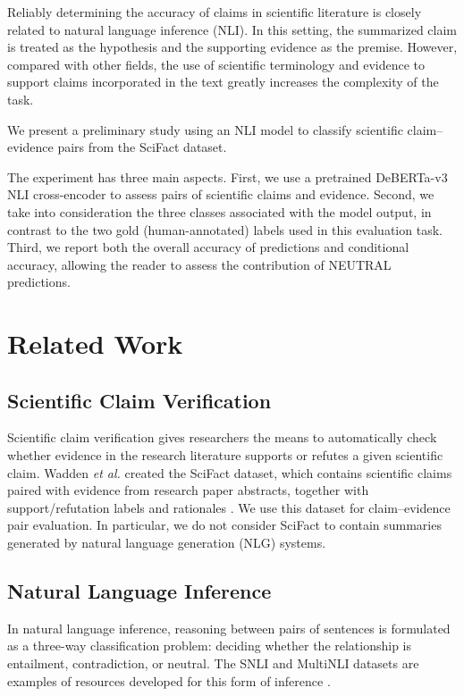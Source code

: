 \documentclass[conference]{IEEEtran}
\begin{document}
Reliably determining the accuracy of claims in scientific literature is closely related to natural language inference (NLI). In this setting, the summarized claim is treated as the hypothesis and the supporting evidence as the premise. However, compared with other fields, the use of scientific terminology and evidence to support claims incorporated in the text greatly increases the complexity of the task.

We present a preliminary study using an NLI model to classify scientific claim--evidence pairs from the SciFact dataset.

The experiment has three main aspects. First, we use a pretrained DeBERTa-v3 NLI cross-encoder to assess pairs of scientific claims and evidence. Second, we take into consideration the three classes associated with the model output, in contrast to the two gold (human-annotated) labels used in this evaluation task. Third, we report both the overall accuracy of predictions and conditional accuracy, allowing the reader to assess the contribution of NEUTRAL predictions.

\section{Related Work}

\subsection{Scientific Claim Verification}
Scientific claim verification gives researchers the means to automatically check whether evidence in the research literature supports or refutes a given scientific claim. Wadden \emph{et al.} created the SciFact dataset, which contains scientific claims paired with evidence from research paper abstracts, together with support/refutation labels and rationales \cite{wadden2020fact}. We use this dataset for claim--evidence pair evaluation. In particular, we do not consider SciFact to contain summaries generated by natural language generation (NLG) systems.

\subsection{Natural Language Inference}
In natural language inference, reasoning between pairs of sentences is formulated as a three-way classification problem: deciding whether the relationship is entailment, contradiction, or neutral. The SNLI and MultiNLI datasets are examples of resources developed for this form of inference \cite{bowman2015large,williams2018broad}.
\end{document}
